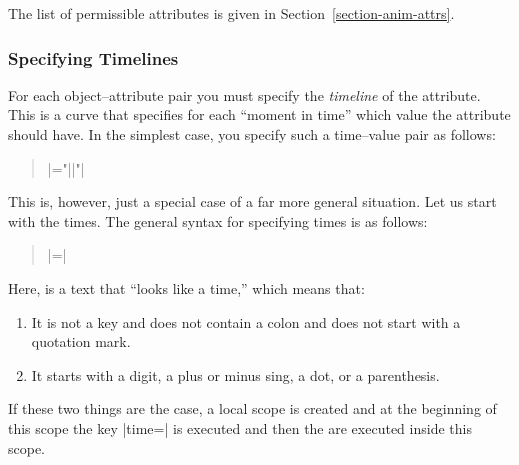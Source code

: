 The list of permissible attributes is given in
Section~\ref{section-anim-attrs}. 

    
\subsubsection{Specifying Timelines}

\label{section-anim-timeline}

For each object--attribute pair you must specify the \emph{timeline}
of the attribute. This is a curve that specifies for each ``moment in
time'' which value the attribute should have. In the simplest case,
you specify such a time--value pair as follows:
\begin{quote}
  \normalfont
   |="||"|    
\end{quote}

This is, however, just a special case of a far more general
situation. Let us start with the times. The general syntax for
specifying times is as follows:

\begin{quote}
  \normalfont
   |=| 
\end{quote}

Here,  is a text that ``looks like a time,'' which means
that:
\begin{enumerate}
\item It is not a key and does not contain a colon and does not start
  with a quotation mark.
\item It starts with a digit, a plus or minus sing, a dot, or a
  parenthesis. 
\end{enumerate}

If these two things are the case, a local scope is created and at the
beginning of this scope the key |time=| is executed and
then the  are executed inside this scope.


